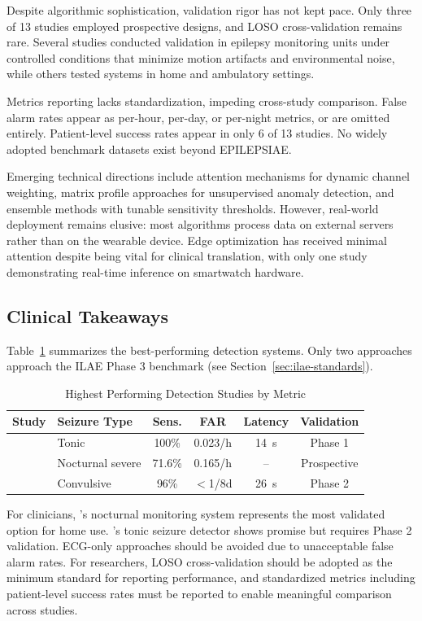 Despite algorithmic sophistication, validation rigor has not kept pace. Only three of 13 studies employed prospective designs, and LOSO cross-validation remains rare. Several studies conducted validation in epilepsy monitoring units under controlled conditions that minimize motion artifacts and environmental noise, while others tested systems in home and ambulatory settings.

Metrics reporting lacks standardization, impeding cross-study comparison. False alarm rates appear as per-hour, per-day, or per-night metrics, or are omitted entirely. Patient-level success rates appear in only 6 of 13 studies. No widely adopted benchmark datasets exist beyond EPILEPSIAE.

Emerging technical directions include attention mechanisms for dynamic channel weighting, matrix profile approaches for unsupervised anomaly detection, and ensemble methods with tunable sensitivity thresholds. However, real-world deployment remains elusive: most algorithms process data on external servers rather than on the wearable device. Edge optimization has received minimal attention despite being vital for clinical translation, with only one study demonstrating real-time inference on smartwatch hardware.

\subsection{Clinical Takeaways}

Table~\ref{tab:detection-performance} summarizes the best-performing detection systems. Only two approaches approach the ILAE Phase 3 benchmark (see Section~\ref{sec:ilae-standards}).

\begin{table}[htbp]
\centering
\small
\caption{Highest Performing Detection Studies by Metric}
\label{tab:detection-performance}
\begin{tabular}{llcccc}
\toprule
\textbf{Study} & \textbf{Seizure Type} & \textbf{Sens.} & \textbf{FAR} & \textbf{Latency} & \textbf{Validation} \\
\midrule
\parencite{fineDetectionKeyAutomated2025} & Tonic & 100\% & 0.023/h & 14~s & Phase 1 \\
\parencite{dongDetectionNocturnalEpileptic2026} & Nocturnal severe & 71.6\% & 0.165/h & -- & Prospective \\
\parencite{spahrDeepLearningbasedDetection2025} & Convulsive & 96\% & $<$1/8d & 26~s & Phase 2 \\
\bottomrule
\end{tabular}
\end{table}

\noindent For clinicians, \parencite{dongDetectionNocturnalEpileptic2026}'s nocturnal monitoring system represents the most validated option for home use. \parencite{fineDetectionKeyAutomated2025}'s tonic seizure detector shows promise but requires Phase 2 validation. ECG-only approaches should be avoided due to unacceptable false alarm rates. For researchers, LOSO cross-validation should be adopted as the minimum standard for reporting performance, and standardized metrics including patient-level success rates must be reported to enable meaningful comparison across studies.
